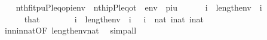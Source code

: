 \begin{isabellebody}
\ \ \isamarkupfalse%
\ {\isachardoublequoteopen}nth{\isacharparenleft}{\kern0pt}{\isacharquery}{\kern0pt}f{\isacharbackquote}{\kern0pt}i{\isacharcomma}{\kern0pt}{\isacharbrackleft}{\kern0pt}t{\isacharcomma}{\kern0pt}p{\isacharcomma}{\kern0pt}u{\isacharcomma}{\kern0pt}P{\isacharcomma}{\kern0pt}leq{\isacharcomma}{\kern0pt}o{\isacharcomma}{\kern0pt}pi{\isacharbrackright}{\kern0pt}{\isacharat}{\kern0pt}env{\isacharparenright}{\kern0pt}\ {\isacharequal}{\kern0pt}\ nth{\isacharparenleft}{\kern0pt}i{\isacharcomma}{\kern0pt}{\isacharbrackleft}{\kern0pt}p{\isacharcomma}{\kern0pt}P{\isacharcomma}{\kern0pt}leq{\isacharcomma}{\kern0pt}o{\isacharcomma}{\kern0pt}t{\isacharbrackright}{\kern0pt}\ {\isacharat}{\kern0pt}\ env\ {\isacharat}{\kern0pt}\ {\isacharbrackleft}{\kern0pt}pi{\isacharcomma}{\kern0pt}u{\isacharbrackright}{\kern0pt}{\isacharparenright}{\kern0pt}{\isachardoublequoteclose}\ \isanewline
\ \ \ \ \ {\isachardoublequoteopen}i\ {\isasymin}\ {\isacharparenleft}{\kern0pt}{}{\isacharhash}{\kern0pt}{\isacharplus}{\kern0pt}length{\isacharparenleft}{\kern0pt}env{\isacharparenright}{\kern0pt}{\isacharminus}{\kern0pt}{}{\isacharparenright}{\kern0pt}{\isachardoublequoteclose}\ \ i\ \isanewline
\ \ \isamarkupfalse%
\ {\isacharminus}{\kern0pt}\isanewline
\ \ \ \ \isamarkupfalse%
\ that\ \isanewline
\ \ \ \ \isamarkupfalse%
\ {}{\isacharcolon}{\kern0pt}\ {\isachardoublequoteopen}i\ {\isasymin}\ {}{\isacharhash}{\kern0pt}{\isacharplus}{\kern0pt}length{\isacharparenleft}{\kern0pt}env{\isacharparenright}{\kern0pt}{\isachardoublequoteclose}\ \ {\isachardoublequoteopen}i\ {\isasymnotin}\ {}{\isachardoublequoteclose}\ {\isachardoublequoteopen}i\ {\isasymin}\ nat{\isachardoublequoteclose}\ {\isachardoublequoteopen}i{\isacharhash}{\kern0pt}{\isacharminus}{\kern0pt}{}{\isasymin}nat{\isachardoublequoteclose}\ {\isachardoublequoteopen}i{\isacharhash}{\kern0pt}{\isacharplus}{\kern0pt}{}{\isasymin}nat{\isachardoublequoteclose}\isanewline
\ \ \ \ \ \ \isamarkupfalse%
\ in{\isacharunderscore}{\kern0pt}n{\isacharunderscore}{\kern0pt}in{\isacharunderscore}{\kern0pt}nat{\isacharbrackleft}{\kern0pt}OF\ {\isacartoucheopen}{}{\isacharhash}{\kern0pt}{\isacharplus}{\kern0pt}length{\isacharparenleft}{\kern0pt}env{\isacharparenright}{\kern0pt}{\isasymin}nat{\isacartoucheclose}{\isacharbrackright}{\kern0pt}\ \isamarkupfalse%
\ simp{\isacharunderscore}{\kern0pt}all\isanewline

\end{isabellebody}
